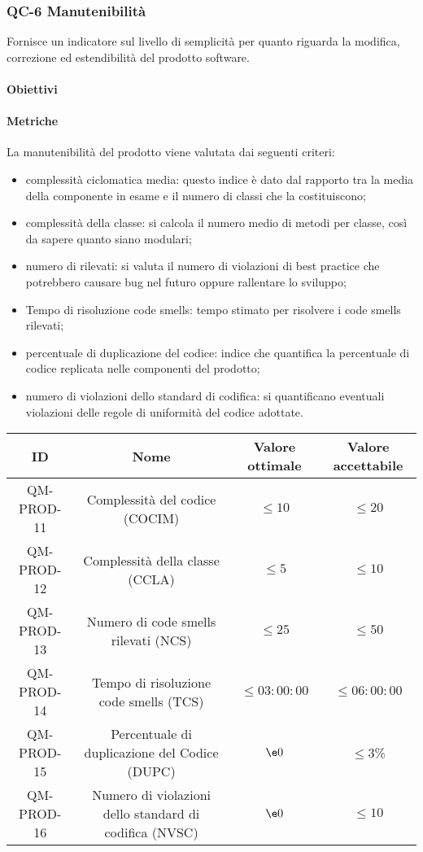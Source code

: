 \subsubsection{QC-6 Manutenibilità}
Fornisce un indicatore sul livello di semplicità per quanto riguarda la modifica, correzione ed estendibilità del prodotto software.
	\paragraph{Obiettivi}
		
	\paragraph{Metriche}
	La manutenibilità del prodotto viene valutata dai seguenti criteri:
	\begin{itemize}
		\item complessità ciclomatica media: questo indice è dato dal rapporto tra la  media della componente in esame e il numero di classi che la costituiscono;
		\item complessità della classe: si calcola il numero medio di metodi per classe, così da sapere quanto siano modulari;
		\item numero di  rilevati: si valuta il numero di violazioni di best practice che potrebbero causare bug nel futuro oppure rallentare lo sviluppo;
		\item Tempo di risoluzione code smells: tempo stimato per risolvere i code smells rilevati;
		\item percentuale di duplicazione del codice: indice che quantifica la percentuale di codice replicata nelle componenti del prodotto;
		\item numero di violazioni dello standard di codifica: si quantificano eventuali violazioni delle regole di uniformità del codice adottate.
	\end{itemize}
	\begin{center}
		\begin{tabular}{|c|c|c|c|}
			\rowcolor{lighter-grayer}
			\hline
			ID & Nome & Valore ottimale & Valore accettabile \\
			\hline
			QM-PROD-11 & Complessità del codice (COCIM) & \(\le 10\) & \(\le 20\) \\
			\hline
			QM-PROD-12 & Complessità della classe (CCLA) & \(\le 5\) & \(\le 10\) \\
			\hline
			QM-PROD-13 & Numero di code smells rilevati (NCS) & \(\le 25\) & \(\le 50\) \\
			\hline
			QM-PROD-14 & Tempo di risoluzione code smells (TCS) & \(\le 03:00:00\) & \(\le 06:00:00\) \\
			\hline
			QM-PROD-15 & Percentuale di duplicazione del Codice (DUPC) & \(\e 0\) & \(\le 3\)\% \\
			\hline
			QM-PROD-16 & Numero di violazioni dello standard di codifica (NVSC) & \(\e 0\) & \(\le 10\) \\
			\hline
		\end{tabular}
	\end{center}
